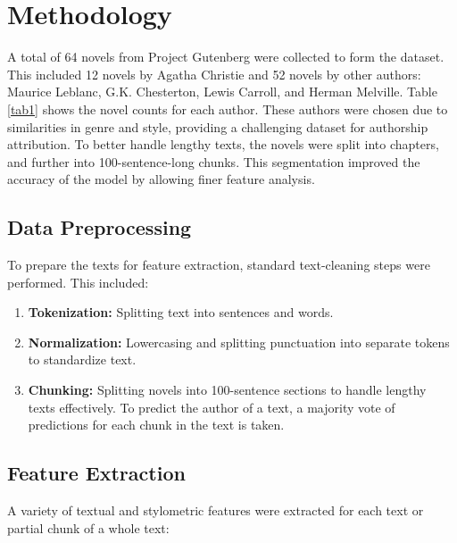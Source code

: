 \documentclass[journal]{IEEEtran} %
\begin{document}
\section{Methodology}
A total of 64 novels from Project Gutenberg were collected to form the dataset. This included 12 novels by Agatha Christie and 52 novels by other authors: Maurice Leblanc, G.K. Chesterton, Lewis Carroll, and Herman Melville. Table \ref{tab1} shows the novel counts for each author. These authors were chosen due to similarities in genre and style, providing a challenging dataset for authorship attribution. To better handle lengthy texts, the novels were split into chapters, and further into 100-sentence-long chunks. This segmentation improved the accuracy of the model by allowing finer feature analysis.

\subsection{Data Preprocessing}  
To prepare the texts for feature extraction, standard text-cleaning steps were performed. This included:
\begin{enumerate}
    \item \textbf{Tokenization:} Splitting text into sentences and words.
    \item \textbf{Normalization:} Lowercasing and splitting punctuation into separate tokens to standardize text.
    \item \textbf{Chunking:} Splitting novels into 100-sentence sections to handle lengthy texts effectively. To predict the author of a text, a majority vote of predictions for each chunk in the text is taken.
\end{enumerate}

\subsection{Feature Extraction}  
A variety of textual and stylometric features were extracted for each text or partial chunk of a whole text:
\end{document}
